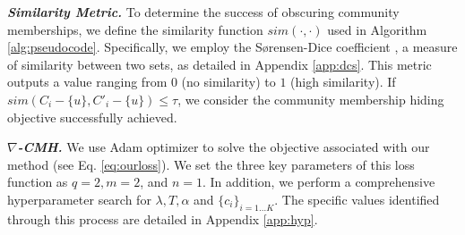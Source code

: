 \begin{table}[htpb]
\centering
\vspace{-1mm}
\caption{Properties of the graph datasets considered in this work, including the number of communities identified by \textit{greedy}, \textit{louvain}, and \textit{walktrap}.}
\label{tab:datasets_and_communities}
    \vspace{-2mm}
\end{table}

\textbf{\textit{Similarity Metric.}} 
To determine the success of obscuring community memberships, we  define the similarity function $sim(\cdot,\cdot)$ used in Algorithm \ref{alg:pseudocode}. Specifically, we employ the Sørensen-Dice coefficient \cite{metrics:Dice}, a measure of similarity between two sets, as detailed in Appendix \ref{app:dcs}. 
This metric outputs a value ranging from $0$ (no similarity) to $1$ (high similarity). If $sim(C_i - \{u\}, C'_i - \{u\}) \leq \tau$, we consider the community membership hiding objective successfully achieved.


\textbf{\textit{$\nabla$-CMH.}} We use Adam optimizer to solve the objective associated with our method (see Eq. \ref{eq:ourloss}). We set the three key parameters of this loss function as $q=2, m=2$, and $n=1$. In addition, we perform a comprehensive hyperparameter search for $\lambda, T, \alpha$ and $\{c_i\}_{i=1\dots K}$. The specific values identified through this process are detailed in Appendix \ref{app:hyp}. 

